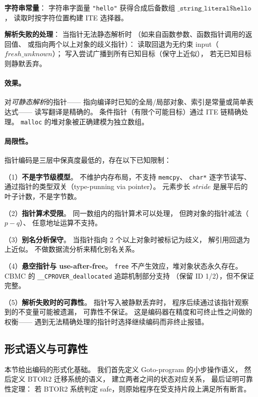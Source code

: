 \documentclass[11pt,a4paper]{article}
\begin{document}
\textbf{字符串常量}：
字符串字面量 \texttt{"hello"} 获得合成后备数组
$\_\mathtt{string\_literal\$hello}$，
读取时按字符位置构建 ITE 选择器。

\textbf{解析失败的处理}：
当指针无法静态解析时
（如来自函数参数、函数指针调用的返回值、
或指向两个以上对象的歧义指针）：
读取回退为无约束 input（$\mathit{fresh\_unknown}$）；
写入尝试广播到所有已知目标（保守上近似），
若无已知目标则静默丢弃。

\paragraph{效果。}
对\emph{可静态解析}的指针——
指向编译时已知的全局/局部对象、索引是常量或简单表达式——
读写翻译是精确的。
条件指针（有限个可能目标）通过 ITE 链精确处理。
\texttt{malloc} 的堆对象被正确建模为独立数组。

\paragraph{局限性。}
指针编码是三层中保真度最低的，存在以下已知限制：

（1）\textbf{不是字节级模型}。
不维护内存布局，不支持 \texttt{memcpy}、
\texttt{char*} 逐字节读写、
通过指针的类型双关（type-punning via pointer）。
元素步长 $\mathit{stride}$ 是展平后的叶子计数，不是字节数。

（2）\textbf{指针算术受限}。
同一数组内的指针算术可以处理，
但跨对象的指针减法（$p - q$）、
任意地址运算不支持。

（3）\textbf{别名分析保守}。
当指针指向 2 个以上对象时被标记为歧义，
解引用回退为上近似。
不做数据流分析来精化别名关系。

（4）\textbf{悬空指针与 use-after-free}。
\texttt{free} 不产生效应，堆对象状态永久存在。
CBMC 的 \texttt{\_\_CPROVER\_deallocated} 追踪机制部分支持
（保留 ID 1/2），但不保证完整。

（5）\textbf{解析失败时的可靠性}。
指针写入被静默丢弃时，
程序后续通过该指针观察到的不变量可能被遗漏，
可靠性不保证。
这是编码器在精度和可终止性之间做的权衡——
遇到无法精确处理的指针时选择继续编码而非终止报错。

\subsection{形式语义与可靠性}
\label{sec:formal-semantics}

本节给出编码的形式化基础。
我们首先定义 Goto-program 的小步操作语义，
然后定义 BTOR2 迁移系统的语义，
建立两者之间的状态对应关系，
最后证明可靠性定理：
若 BTOR2 系统判定 safe，则原始程序在受支持片段上满足所有断言。
\end{document}

